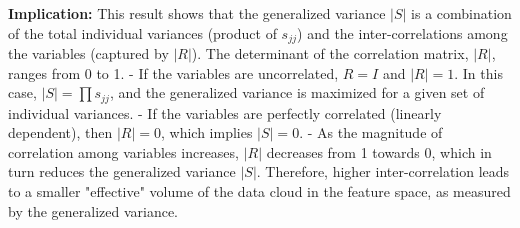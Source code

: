 \textbf{Implication:}
This result shows that the generalized variance $|S|$ is a combination of the total individual variances (product of $s_{jj}$) and the inter-correlations among the variables (captured by $|R|$).
The determinant of the correlation matrix, $|R|$, ranges from 0 to 1.
- If the variables are uncorrelated, $R=I$ and $|R|=1$. In this case, $|S| = \prod s_{jj}$, and the generalized variance is maximized for a given set of individual variances.
- If the variables are perfectly correlated (linearly dependent), then $|R|=0$, which implies $|S|=0$.
- As the magnitude of correlation among variables increases, $|R|$ decreases from 1 towards 0, which in turn reduces the generalized variance $|S|$. Therefore, higher inter-correlation leads to a smaller "effective" volume of the data cloud in the feature space, as measured by the generalized variance.
